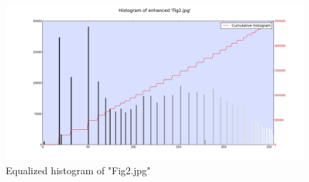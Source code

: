     \begin{figure}[h]
        \centering
        \includegraphics[width=\linewidth]{./images/Equalized_Histogram_Fig2.jpg}
        \caption{Equalized histogram of "Fig2.jpg"}
        \label{diagram:equal_hist_fig2}
    \end{figure}
